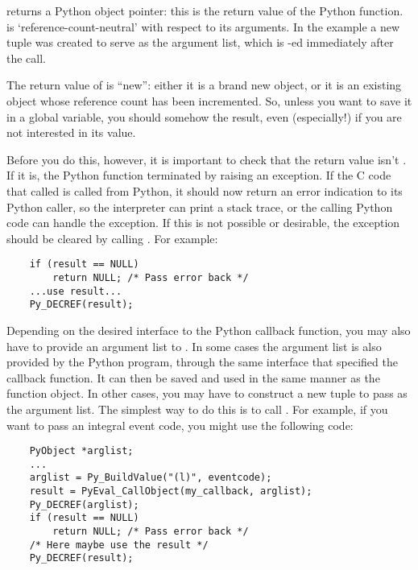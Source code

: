  returns a Python object pointer: this is
the return value of the Python function.   is
`reference-count-neutral' with respect to its arguments.  In the
example a new tuple was created to serve as the argument list, which
is -ed immediately after the call.

The return value of  is ``new'': either it
is a brand new object, or it is an existing object whose reference
count has been incremented.  So, unless you want to save it in a
global variable, you should somehow  the result,
even (especially!) if you are not interested in its value.

Before you do this, however, it is important to check that the return
value isn't .  If it is, the Python function terminated by raising
an exception.  If the C code that called  is
called from Python, it should now return an error indication to its
Python caller, so the interpreter can print a stack trace, or the
calling Python code can handle the exception.  If this is not possible
or desirable, the exception should be cleared by calling
.  For example:

\begin{verbatim}
    if (result == NULL)
        return NULL; /* Pass error back */
    ...use result...
    Py_DECREF(result); 
\end{verbatim}

Depending on the desired interface to the Python callback function,
you may also have to provide an argument list to .
In some cases the argument list is also provided by the Python
program, through the same interface that specified the callback
function.  It can then be saved and used in the same manner as the
function object.  In other cases, you may have to construct a new
tuple to pass as the argument list.  The simplest way to do this is to
call .  For example, if you want to pass an integral
event code, you might use the following code:

\begin{verbatim}
    PyObject *arglist;
    ...
    arglist = Py_BuildValue("(l)", eventcode);
    result = PyEval_CallObject(my_callback, arglist);
    Py_DECREF(arglist);
    if (result == NULL)
        return NULL; /* Pass error back */
    /* Here maybe use the result */
    Py_DECREF(result);
\end{verbatim}

